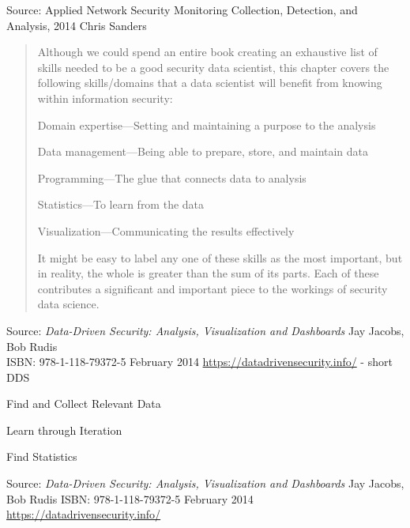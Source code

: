 \documentclass[Screen16to9,17pt]{foils}
\begin{document}
Source: Applied Network Security Monitoring Collection, Detection, and Analysis, 2014 Chris Sanders



\begin{quote}
Although we could spend an entire book creating an exhaustive list of skills needed to be a good security data scientist, this chapter covers the following skills/domains that a data scientist will benefit from
knowing within information security:
\begin{list2}
\item Domain expertise—Setting and maintaining a purpose to the analysis
\item Data management—Being able to prepare, store, and maintain data
\item Programming—The glue that connects data to analysis
\item Statistics—To learn from the data
\item Visualization—Communicating the results effectively
\end{list2}
It might be easy to label any one of these skills as the most important, but in reality, the whole is greater than the sum of its parts. Each of these contributes a significant and important piece to the workings of
security data science.
\end{quote}

Source: \emph{Data-Driven Security: Analysis, Visualization and Dashboards} Jay Jacobs, Bob Rudis\\
ISBN: 978-1-118-79372-5 February 2014 \url{https://datadrivensecurity.info/} - short DDS






\begin{list2}
\item Find and Collect Relevant Data
\item Learn through Iteration
\item Find Statistics
\end{list2}
Source: \emph{Data-Driven Security: Analysis, Visualization and Dashboards} Jay Jacobs, Bob Rudis
ISBN: 978-1-118-79372-5 February 2014 \url{https://datadrivensecurity.info/}



\end{document}
